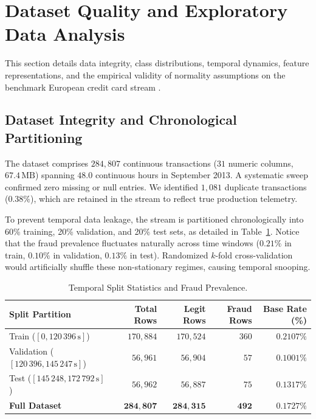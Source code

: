 \section{Dataset Quality and Exploratory Data Analysis}
\label{sec:dataset_eda}

This section details data integrity, class distributions, temporal dynamics, feature representations, and the empirical validity of normality assumptions on the benchmark European credit card stream \cite{dalpozzolo2018credit}.

\subsection{Dataset Integrity and Chronological Partitioning}
The dataset comprises $284,807$ continuous transactions ($31$ numeric columns, $67.4\,\text{MB}$) spanning $48.0$ continuous hours in September 2013. A systematic sweep confirmed zero missing or null entries. We identified $1,081$ duplicate transactions ($0.38\%$), which are retained in the stream to reflect true production telemetry.

To prevent temporal data leakage, the stream is partitioned chronologically into 60\% training, 20\% validation, and 20\% test sets, as detailed in Table~\ref{tab:splits}. Notice that the fraud prevalence fluctuates naturally across time windows ($0.21\%$ in train, $0.10\%$ in validation, $0.13\%$ in test). Randomized $k$-fold cross-validation would artificially shuffle these non-stationary regimes, causing temporal snooping.

\begin{table}[h]
\centering
\caption{Temporal Split Statistics and Fraud Prevalence.}
\label{tab:splits}
\footnotesize
\begin{tabular}{lrrrr}
\hline
\textbf{Split Partition} & \textbf{Total Rows} & \textbf{Legit Rows} & \textbf{Fraud Rows} & \textbf{Base Rate (\%)} \\
\hline
Train ($[0, 120\,396\,\text{s}]$) & $170,884$ & $170,524$ & $360$ & $0.2107\%$ \\
Validation ($[120\,396, 145\,247\,\text{s}]$) & $56,961$ & $56,904$ & $57$ & $0.1001\%$ \\
Test ($[145\,248, 172\,792\,\text{s}]$) & $56,962$ & $56,887$ & $75$ & $0.1317\%$ \\
\hline
\textbf{Full Dataset} & $\mathbf{284,807}$ & $\mathbf{284,315}$ & $\mathbf{492}$ & $\mathbf{0.1727\%}$ \\
\hline
\end{tabular}
\end{table}

